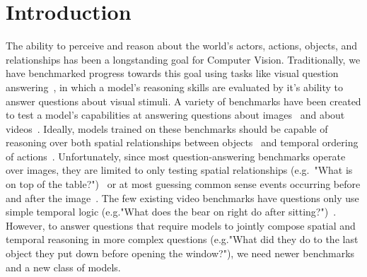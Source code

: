 \section{Introduction}

The ability to perceive and reason about the world's actors, actions, objects, and relationships has been a longstanding goal for Computer Vision. 
Traditionally, we have benchmarked progress towards this goal using tasks like visual question answering~\cite{antol2015vqa}, in which a model's reasoning skills are evaluated by it's ability to answer questions about visual stimuli. 
A variety of benchmarks have been created to test a model's capabilities at answering questions about images~\cite{johnson2017clevr,hudson2019gqa,antol2015vqa,zellers2019recognition,goyal2017making,krishna2017visual,zhu2016visual7w,kim2020answering} and about videos~\cite{tapaswi2016movieqa,lei2018tvqa,jang2017tgif,kim2017deepstory,xu2017video,maharaj2017dataset,zeng2016leveraging,yu2019activitynet, yi2019clevrer, mun2017marioqa}. 
Ideally, models trained on these benchmarks should be capable of reasoning over both spatial relationships between objects~\cite{krishna2017visual,lu2016visual} and temporal ordering of actions~\cite{zacks2001events,ji2020action}. 
Unfortunately, since most question-answering benchmarks operate over images, they are limited to only testing spatial relationships (e.g.~"What is on top of the table?")~\cite{hudson2019gqa,krishna2017visual,antol2015vqa} or at most guessing common sense events occurring before and after the image~\cite{park2020visualcomet,zellers2019recognition}. 
The few existing video benchmarks have questions only use simple temporal logic (e.g."What does the bear on right do after sitting?")~\cite{jang2017tgif,xu2017video,maharaj2017dataset,zeng2016leveraging,yu2019activitynet}. 
However, to answer questions that require models to jointly compose spatial and temporal reasoning in more complex questions (e.g."What did they do to the last object they put down before opening the window?"), we need newer benchmarks and a new class of models.


